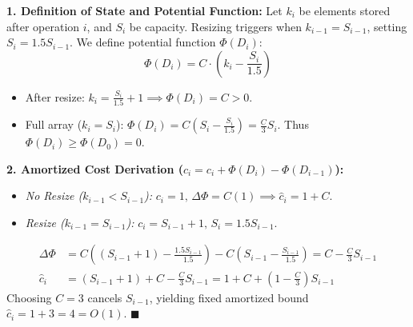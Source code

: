 \documentclass[11pt,a4paper]{article}
\begin{document}
\begin{tcolorbox}[solutionbox, title={\faCheckCircle~~Solution 1(a): Amortized Analysis via Potential Method}]
\textbf{1. Definition of State and Potential Function:}
Let $k_i$ be elements stored after operation $i$, and $S_i$ be capacity. Resizing triggers when $k_{i-1} = S_{i-1}$, setting $S_i = 1.5 S_{i-1}$. We define potential function $\Phi(D_i)$:
\begin{equation}
\Phi(D_i) = C \cdot \left( k_i - \frac{S_i}{1.5} \right)
\end{equation}
\begin{itemize}[leftmargin=1.5em, itemsep=0pt]
    \item After resize: $k_i = \frac{S_i}{1.5} + 1 \implies \Phi(D_i) = C > 0$.
    \item Full array ($k_i = S_i$): $\Phi(D_i) = C \left( S_i - \frac{S_i}{1.5} \right) = \frac{C}{3} S_i$. Thus $\Phi(D_i) \ge \Phi(D_0) = 0$.
\end{itemize}

\textbf{2. Amortized Cost Derivation ($\hat{c}_i = c_i + \Phi(D_i) - \Phi(D_{i-1})$):}
\begin{itemize}[leftmargin=1.5em, itemsep=1pt]
    \item \textit{No Resize ($k_{i-1} < S_{i-1}$):} $c_i = 1, \, \Delta\Phi = C(1) \implies \hat{c}_i = 1 + C$.
    \item \textit{Resize ($k_{i-1} = S_{i-1}$):} $c_i = S_{i-1} + 1, \, S_i = 1.5 S_{i-1}$.
\end{itemize}
\begin{align*}
\Delta \Phi &= C \left( (S_{i-1} + 1) - \frac{1.5 S_{i-1}}{1.5} \right) - C \left( S_{i-1} - \frac{S_{i-1}}{1.5} \right) = C - \frac{C}{3} S_{i-1} \\
\hat{c}_i &= (S_{i-1} + 1) + C - \frac{C}{3} S_{i-1} = 1 + C + \left( 1 - \frac{C}{3} \right) S_{i-1}
\end{align*}
Choosing $C = 3$ cancels $S_{i-1}$, yielding fixed amortized bound $\hat{c}_i = 1 + 3 = 4 = O(1)$. $\blacksquare$
\end{tcolorbox}

\newpage

\end{document}
